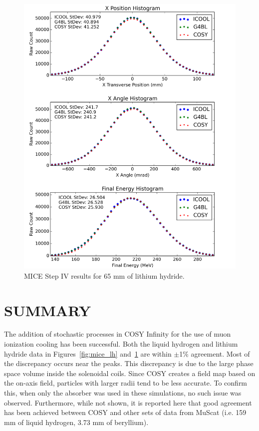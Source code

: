 \documentclass[a4paper,11pt]{article}
\begin{document}
\begin{figure}[!htb]
  \centering
    \includegraphics[width=0.7\columnwidth]{Figures/MICE_LiH} 
  \caption{MICE Step IV results for 65 mm of lithium hydride.}
  \label{fig:mice_lih}
\end{figure}

\section{SUMMARY}
The addition of stochastic processes in COSY Infinity for the use of muon ionization cooling has been successful. Both the liquid hydrogen and lithium hydride data in Figures~\ref{fig:mice_lh} and~\ref{fig:mice_lih} are within $\pm$1\% agreement. Most of the discrepancy occurs near the peaks. This discrepancy is due to the large phase space volume inside the solenoidal coils. Since COSY creates a field map based on the on-axis field, particles with larger radii tend to be less accurate. To confirm this, when only the absorber was used in these simulations, no such issue was observed. Furthermore, while not shown, it is reported here that good agreement has been achieved between COSY and other sets of data from MuScat \cite{Muscat} (i.e. 159 mm of liquid hydrogen, 3.73 mm of beryllium).


\end{document}
